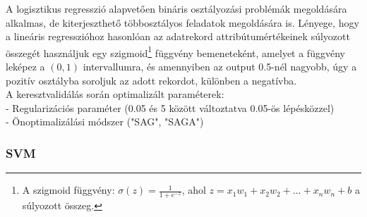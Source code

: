 \documentclass[12pt]{article}
\begin{document}
A logisztikus regresszió alapvetően bináris osztályozási problémák megoldására alkalmas, de kiterjeszthető többosztályos feladatok megoldására is. Lényege, hogy a lineáris regresszióhoz hasonlóan az adatrekord attribútumértékeinek súlyozott összegét használjuk egy szigmoid\footnote{A szigmoid függvény: $\sigma(z)=\frac{1}{1+e^{-z}}$, ahol $z=x_1w_1+x_2w_2+ \dots +x_nw_n+b$ a súlyozott összeg.} függvény bemeneteként, amelyet a függvény leképez a $\left(0,1\right)$ intervallumra, és amennyiben az output 0.5-nél nagyobb, úgy a pozitív osztályba soroljuk az adott rekordot, különben a negatívba. \\

\noindent A keresztvalidálás során optimalizált paraméterek: \\
- Regularizációs paraméter (0.05 és 5 között változtatva 0.05-ös lépésközzel) \\
- Önoptimalizálási módszer ("SAG", "SAGA") 

\subsubsection{SVM}

%
\end{document}
